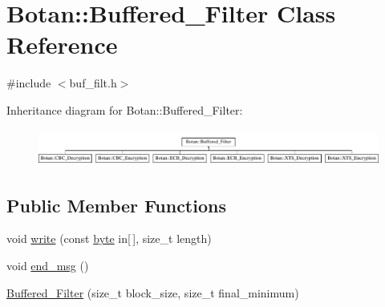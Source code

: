 \hypertarget{classBotan_1_1Buffered__Filter}{\section{Botan\-:\-:Buffered\-\_\-\-Filter Class Reference}
\label{classBotan_1_1Buffered__Filter}
}


{\ttfamily \#include $<$buf\-\_\-filt.\-h$>$}

Inheritance diagram for Botan\-:\-:Buffered\-\_\-\-Filter\-:\begin{figure}[H]
\begin{center}
\leavevmode
\includegraphics[height=1.220044cm]{classBotan_1_1Buffered__Filter}
\end{center}
\end{figure}
\subsection*{Public Member Functions}
\begin{DoxyCompactItemize}
\item 
void \hyperlink{classBotan_1_1Buffered__Filter_abd3267199ce5205551c56b9ff7d01967}{write} (const \hyperlink{namespaceBotan_a7d793989d801281df48c6b19616b8b84}{byte} in\mbox{[}$\,$\mbox{]}, size\-\_\-t length)
\item 
void \hyperlink{classBotan_1_1Buffered__Filter_ad43d5c445d2176f96e90e012afdb670e}{end\-\_\-msg} ()
\item 
\hyperlink{classBotan_1_1Buffered__Filter_a93f737bba903070d68c6ba64137f2bad}{Buffered\-\_\-\-Filter} (size\-\_\-t block\-\_\-size, size\-\_\-t final\-\_\-minimum)
\end{DoxyCompactItemize}
